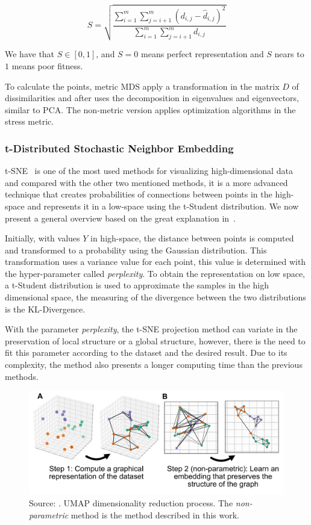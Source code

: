 \begin{equation}
    S = \sqrt{\dfrac{\sum_{i = 1}^m \sum_{j = i + 1} ^m (d_{i, j} - \hat d_{i, j})^2}{\sum_{i = 1}^m \sum_{j = i + 1}^m  d_{i, j}}}
\end{equation}
\label{eq:stress-measure}

We have that $S \in [0, 1]$, and $S = 0$ means perfect representation and $S$ nears to $1$ means poor fitness.


%
To calculate the points, metric MDS apply a transformation in the matrix $D$ of dissimilarities and after uses the decomposition in eigenvalues and eigenvectors, similar to PCA. 
%
The non-metric version applies optimization algorithms in the stress metric.

\subsubsection{t-Distributed Stochastic Neighbor Embedding}
%
t-SNE~\cite{van2008visualizing} is one of the most used methods for visualizing high-dimensional data 
%
and compared with the other two mentioned methods,
%
it is a more advanced technique that creates probabilities of connections between points in the high-space and 
%
represents it in a low-space using the t-Student distribution.
%
We now present a general overview based on the great explanation in~\cite{stelling2019entendendo}.
%

Initially, with values $Y$ in high-space, the distance between points is computed and transformed to a probability using the Gaussian distribution.
%
This transformation uses a variance value for each point, this value is determined with the hyper-parameter called \textit{perplexity}. 
%
To obtain the representation on low space, a t-Student distribution is used to approximate the samples in the high dimensional space, the measuring of the divergence between the two distributions is the KL-Divergence.

With the parameter \textit{perplexity}, the t-SNE projection method can variate in the preservation of local structure or a global structure, however, there is the need to fit this parameter according to the dataset and the desired result.
%
Due to its complexity, the method also presents a longer computing time than the previous methods.

\begin{figure}
    \centering
    \includegraphics[width = \textwidth]{src/imgs/umap-explanation.png}
    \caption{Source: \cite{sainburg2021parametric}. UMAP dimensionality reduction process. The \textit{non-parametric} method is the method described in this work.}
    \label{fig:umap_explanation}
\end{figure}

